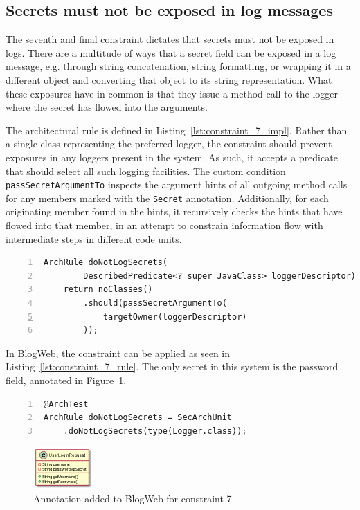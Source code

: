 \subsection{Secrets must not be exposed in log messages}
The seventh and final constraint dictates that secrets must not be exposed in logs. There are a multitude of ways that a secret field can be exposed in a log message, e.g. through string concatenation, string formatting, or wrapping it in a different object and converting that object to its string representation. What these exposures have in common is that they issue a method call to the logger where the secret has flowed into the arguments.

The architectural rule is defined in Listing~\ref{lst:constraint_7_impl}. Rather than a single class representing the preferred logger, the constraint should prevent exposures in any loggers present in the system. As such, it accepts a predicate that should select all such logging facilities. The custom condition \texttt{passSecretArgumentTo} inspects the argument hints of all outgoing method calls for any members marked with the \texttt{Secret} annotation. Additionally, for each originating member found in the hints, it recursively checks the hints that have flowed into that member, in an attempt to constrain information flow with intermediate steps in different code units.

\begin{minipage}{\linewidth}
\begin{lstlisting}[caption={Rule definition for constraint 7.}, captionpos=b, label=lst:constraint_7_impl, numbers=left]
ArchRule doNotLogSecrets(
        DescribedPredicate<? super JavaClass> loggerDescriptor) {
    return noClasses()
        .should(passSecretArgumentTo(
            targetOwner(loggerDescriptor)
        ));
\end{lstlisting}
\end{minipage}

In BlogWeb, the constraint can be applied as seen in Listing~\ref{lst:constraint_7_rule}. The only secret in this system is the password field, annotated in Figure~\ref{fig:secrets_toy_system}.

\begin{minipage}{\linewidth}
\begin{lstlisting}[caption={Application of constraint 7 to BlogWeb.}, captionpos=b, label=lst:constraint_7_rule, numbers=left]
@ArchTest
ArchRule doNotLogSecrets = SecArchUnit
    .doNotLogSecrets(type(Logger.class));
\end{lstlisting}
\end{minipage}

\begin{figure}
    \centering
    \includegraphics[width=0.2\textwidth]{figure/toyexamples/Secrets.png}
    \caption{Annotation added to BlogWeb for constraint 7.}
    \label{fig:secrets_toy_system}
\end{figure}